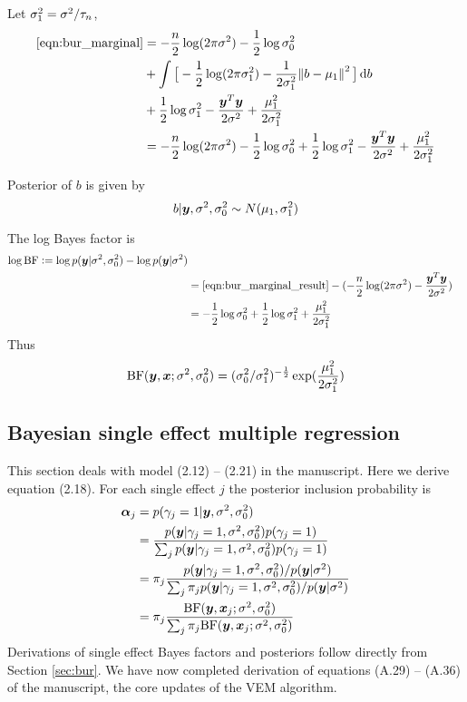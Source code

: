 Let $\sigma^2_1 = \sigma^2 / \tau_n$, 
\begin{align}
    \eqref{eqn:bur_marginal} &= -\frac{n}{2}\log(2\pi\rv) - \frac{1}{2} \log \rv_0 \\
    &+ \int \big[-\frac{1}{2} \log(2\pi\rv_1) - \frac{1}{2\rv_1}\norm{b-\mu_1}^2 \big] \dif b \\
    &+ \frac{1}{2}\log \rv_1 - \frac{\vy^T\vy}{2\rv} + \frac{\mu_1^2}{2\rv_1} \\
    &= -\frac{n}{2}\log(2\pi\rv) - \frac{1}{2} \log \rv_0 + \frac{1}{2}\log \rv_1 - \frac{\vy^T\vy}{2\rv} + \frac{\mu_1^2}{2\rv_1} \label{eqn:bur_marginal_result}
\end{align}

Posterior of $b$ is given by
\begin{equation}
b | \bm y, \sigma^2, \sigma^2_0 \sim N(\mu_1, \sigma^2_1)
\end{equation}

The log Bayes factor is
\begin{align}
    \log \text{BF} := \log p(\bm y|\sigma^2, \sigma^2_0) - \log p(\bm y | \sigma^2) \\
    &= \eqref{eqn:bur_marginal_result} - (-\frac{n}{2}\log(2\pi\sigma^2) - \frac{\bm y^T\bm y}{2\sigma^2}) \\
    &= - \frac{1}{2} \log \sigma^2_0 + \frac{1}{2}\log \sigma^2_1 + \frac{\mu_1^2}{2\sigma^2_1}
\end{align}
Thus 
\begin{equation}
\text{BF}(\bm y, \bm x; \sigma^2, \sigma^2_0) = (\sigma^2_0/\sigma^2_1)^{-\frac{1}{2}}\exp(\frac{\mu_1^2}{2\sigma^2_1})
\end{equation}

\subsection{Bayesian single effect multiple regression} \label{sec:bser}

This section deals with model (2.12) -- (2.21) in the manuscript. Here we derive equation (2.18). For each single effect $j$ the posterior inclusion probability is
\begin{align}
    \bm \alpha_j &= p(\gamma_j = 1 | \bm y, \sigma^2, \sigma^2_0) \\
    &= \frac{p(\bm y | \gamma_j = 1, \sigma^2, \sigma^2_0)p(\gamma_j=1)}{\sum_j p(\bm y | \gamma_j = 1, \sigma^2, \sigma^2_0)p(\gamma_j=1)} \\
    &= \pi_j \frac{p(\bm y | \gamma_j = 1, \sigma^2, \sigma^2_0) / p(\bm y|\sigma^2)}{\sum_j \pi_j p(\bm y | \gamma_j = 1, \sigma^2, \sigma^2_0) / p(\bm y | \sigma^2)} \\
    &= \pi_j \frac{\text{BF}(\bm y, \bm x_j; \sigma^2, \sigma^2_0)}{\sum_j \pi_j \text{BF}(\bm y, \bm x_j; \sigma^2, \sigma^2_0)}
\end{align}
Derivations of single effect Bayes factors and posteriors follow directly from Section \ref{sec:bur}. We have now completed derivation of equations (A.29) -- (A.36) of the manuscript, the core updates of the \susie VEM algorithm.

